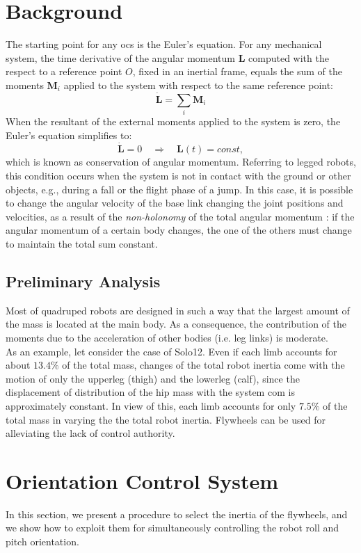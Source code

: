 \documentclass[sensors,article,submit,pdftex,moreauthors]{Definitions/mdpi}
\begin{document}
\section{Background}
\label{sec:background}
The starting point for any \gls{ocs} is the Euler's equation. For any mechanical system, the time derivative of the angular momentum $\bm{L}$ computed with the respect to a reference point $O$, fixed in an inertial frame, equals the sum of the moments $\bm{M}_i$ applied to the system with respect to the same reference point:
\begin{equation}
\dot{\bm{L}} = \sum_i \bm{M}_i
\end{equation}
When the resultant of the external moments applied to the system is zero, the Euler's equation simplifies to:
\begin{equation}
\dot{\bm{L}} = 0 \quad \Rightarrow \quad \bm{L}(t) = const,
\label{eq:cons_ang_mom}
\end{equation}
which is known as conservation of angular momentum.
Referring to legged robots, this condition occurs when the system is not in contact with the ground or other objects, e.g., during a fall or the flight phase of a jump.
In this case, it is possible to change the angular velocity of the base link changing the joint positions and velocities, as a result of the \textit{non-holonomy} of the total angular momentum \cite{Wieber16}: if the angular momentum of a certain body changes, the one of the others must change to maintain the total sum constant.
\subsection{Preliminary Analysis}
Most of quadruped robots are designed in such a way that the largest amount of the mass is located at the main body. As a consequence, the contribution of the moments due to the acceleration of other bodies (i.e. leg links) is moderate. \\
As an example, let consider the case of Solo12. Even if each limb accounts for about $13.4\%$ of the total mass, changes of the total robot inertia come with the motion of only the upperleg (thigh) and the lowerleg (calf), since the displacement of distribution of the hip mass with the system \acrshort{com} is approximately constant. In view of this, each limb accounts for only $7.5\%$ of the total mass in varying the the total robot inertia. Flywheels can be used for alleviating the lack of control authority.


\section{Orientation Control System}
\label{sec:ocs}
In this section, we present a procedure to select the inertia of the flywheels, and we show how to exploit them for simultaneously controlling the robot roll and pitch orientation.
\end{document}
